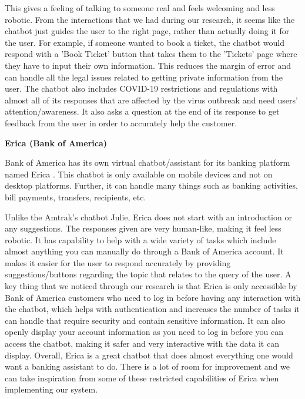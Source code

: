 \documentclass[titlepage, 12pt]{article}
\begin{document}
This gives a feeling of talking to someone real and feels welcoming and less robotic. From the interactions that we had during our research, it seems like the chatbot just guides the user to the right page, rather than actually doing it for the user. For example, if someone wanted to book a ticket, the chatbot would respond with a 'Book Ticket' button that takes them to the 'Tickets' page where they have to input their own information. This reduces the margin of error and can handle all the legal issues related to getting private information from the user. The chatbot also includes COVID-19 restrictions and regulations with almost all of its responses that are affected by the virus outbreak and need users' attention/awareness. It also asks a question at the end of its response to get feedback from the user in order to accurately help the customer.

\textbf{Erica (Bank of America)}

Bank of America has its own virtual chatbot/assistant for its banking platform named Erica \cite{bib-1-15}. This chatbot is only available on mobile devices and not on desktop platforms. Further, it can handle many things such as banking activities, bill payments, transfers, recipients, etc.


Unlike the Amtrak’s chatbot Julie, Erica does not start with an introduction or any suggestions. The responses given are very human-like, making it feel less robotic. It has capability to help with a wide variety of tasks which include almost anything you can manually do through a Bank of America account. It makes it easier for the user to respond accurately by providing suggestions/buttons regarding the topic that relates to the query of the user. A key thing that we noticed through our research is that Erica is only accessible by Bank of America customers who need to log in before having any interaction with the chatbot, which helps with authentication and increases the number of tasks it can handle that require security and contain sensitive information. It can also openly display your account information as you need to log in before you can access the chatbot, making it safer and very interactive with the data it can display. Overall, Erica is a great chatbot that does almost everything one would want a banking assistant to do. There is a lot of room for improvement and we can take inspiration from some of these restricted capabilities of Erica when implementing our system. \\ \\
\end{document}
